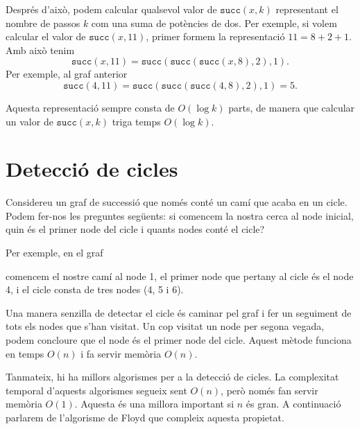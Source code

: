 Després d'això, podem calcular qualsevol valor de $\texttt{succ}(x,k)$
representant el nombre de passos $k$ com una suma de potències de
dos. Per exemple, si volem calcular el valor de $\texttt{succ}(x,11)$,
primer formem la representació $11=8+2+1$. Amb això tenim
\[\texttt{succ}(x,11)=\texttt{succ}(\texttt{succ}(\texttt{succ}(x,8),2),1).\]
Per exemple, al graf anterior
\[\texttt{succ}(4,11)=\texttt{succ}(\texttt{succ}(\texttt{succ}(4,8),2),1)=5.\]


Aquesta representació sempre consta de $O(\log k)$ parts, de manera
que calcular un valor de $\texttt{succ}(x,k)$ triga temps $O(\log k)$.

\section{Detecció de cicles}

 

Considereu un graf de successió que només conté un camí que acaba en
un cicle. Podem fer-nos les preguntes següents: si comencem la nostra
cerca al node inicial, quin és el primer node del cicle i quants
nodes conté el cicle?

Per exemple, en el graf


\begin{center}
\end{center}
comencem el nostre camí al node 1, el primer node que pertany al cicle
és el node 4, i el cicle consta de tres nodes (4, 5 i 6).

Una manera senzilla de detectar el cicle és caminar pel graf i fer un
seguiment de tots els nodes que s'han visitat. Un cop visitat un node
per segona vegada, podem concloure que el node és el primer node del
cicle. Aquest mètode funciona en temps $O(n)$ i fa servir memòria
$O(n)$.

Tanmateix, hi ha millors algorismes per a la detecció de cicles. La
complexitat temporal d'aquests algorismes segueix sent $O(n)$, però
només fan servir memòria $O(1)$. Aquesta és una millora important si
$n$ és gran. A continuació parlarem de l'algorisme de Floyd que
compleix aquesta propietat.


